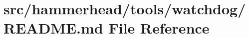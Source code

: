 \hypertarget{tools_2watchdog_2README_8md}{}\section{src/hammerhead/tools/watchdog/\+R\+E\+A\+D\+ME.md File Reference}
\label{tools_2watchdog_2README_8md}
